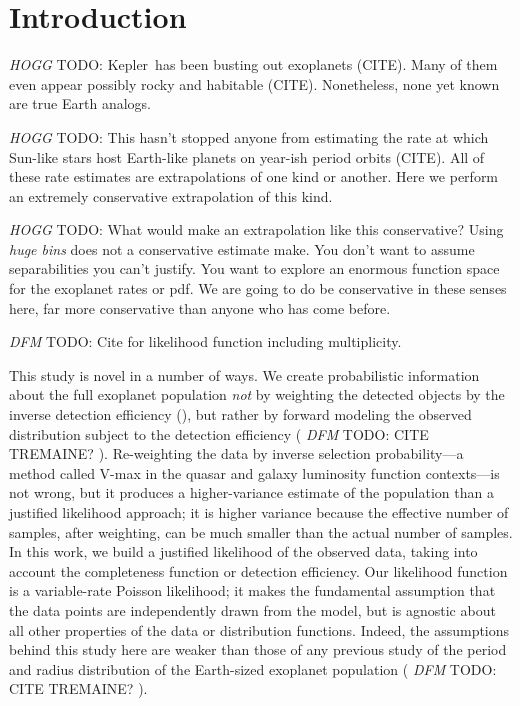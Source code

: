 \documentclass[12pt,preprint]{aastex}
\newcommand{\project}[1]{{\sffamily #1}}
\newcommand{\kepler}{\project{Kepler}}
\newcommand{\todo}[3]{{\color{#2} \emph{#1} TODO: #3}}
\newcommand{\dfmtodo}[1]{\todo{DFM}{red}{#1}}
\newcommand{\hoggtodo}[1]{\todo{HOGG}{blue}{#1}}
\begin{document}

\section{Introduction}

\hoggtodo{%
\kepler\ has been busting out exoplanets (CITE).
Many of them even appear possibly rocky and habitable (CITE).
Nonetheless, none yet known are true Earth analogs.
}

\hoggtodo{%
This hasn't stopped anyone from estimating the rate at which Sun-like stars
host Earth-like planets on year-ish period orbits (CITE).
All of these rate estimates are extrapolations of one kind or another.
Here we perform an extremely conservative extrapolation of this kind.
}

\hoggtodo{%
What would make an extrapolation like this conservative?
Using \emph{huge bins} does not a conservative estimate make.
You don't want to assume separabilities you can't justify.
You want to explore an enormous function space for the exoplanet rates or pdf.
We are going to do be conservative in these senses here, far more conservative
than anyone who has come before.
}

\dfmtodo{%
Cite \citet{tremaine} for likelihood function including multiplicity.
}

This study is novel in a number of ways.
We create probabilistic information about the full exoplanet population
\emph{not} by weighting the detected objects by the inverse detection
efficiency (\citealt{petigura}), but rather by forward modeling the
observed distribution subject to the detection efficiency
(\dfmtodo{CITE TREMAINE?} \citealt{dong}).
Re-weighting the data by inverse selection probability---a method called
V-max in the quasar and galaxy luminosity function contexts---is not wrong,
but it produces a higher-variance estimate of the population than a justified
likelihood approach; it is higher variance because
the effective number of samples, after
weighting, can be much smaller than the actual number of samples.
In this work, we build a justified
likelihood of the observed data, taking into account the completeness function
or detection efficiency.
Our likelihood function is a variable-rate Poisson likelihood; it makes the
fundamental assumption that the data points are independently drawn from the
model, but is agnostic about all other properties of the data or distribution
functions.
Indeed, the assumptions behind this study here are weaker than those of any
previous study of the period and radius distribution of the Earth-sized
exoplanet population (\dfmtodo{CITE TREMAINE?} \citealt{dong, petigura}).
\end{document}
